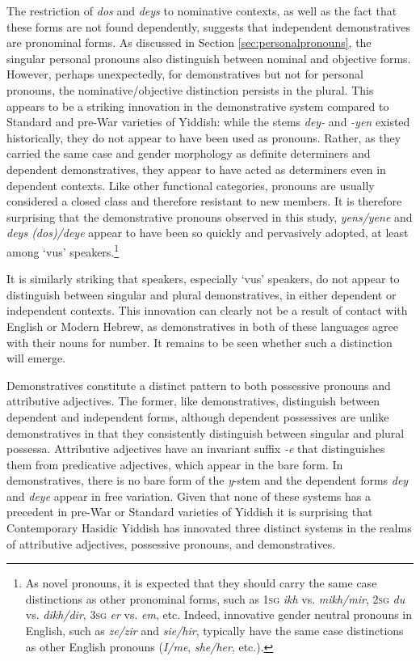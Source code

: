 \documentclass[output=paper, hidelinks]{langscibook}
\begin{document}
The restriction of \textit{dos} and \textit{deys} to nominative contexts, as well as the fact that these forms are not found dependently, suggests that independent demonstratives are pronominal forms. As discussed in Section \ref{sec:personalpronouns}, the singular personal pronouns also distinguish between nominal and objective forms. However, perhaps unexpectedly, for demonstratives but not for personal pronouns, the nominative/objective distinction persists in the plural. This appears to be a striking innovation in the demonstrative system compared to Standard and pre-War varieties of Yiddish: while the stems \textit{dey-} and \textit{-yen} existed historically, they do not appear to have been used as pronouns. Rather, as they carried the same case and gender morphology as definite determiners and dependent demonstratives, they appear to have acted as determiners even in dependent contexts. Like other functional categories, pronouns are usually considered a closed class and therefore resistant to new members. It is therefore surprising that the demonstrative pronouns observed in this study, \textit{yens/yene} and \textit{deys (dos)/deye} appear to have been so quickly and pervasively adopted, at least among `vus' speakers.\footnote{As novel pronouns, it is expected that they should carry the same case distinctions as other pronominal forms, such as 1\textsc{sg} \textit{ikh} vs. \textit{mikh/mir}, 2\textsc{sg} \textit{du} vs. \textit{dikh/dir}, 3\textsc{sg} \textit{er} vs. \textit{em}, etc. Indeed, innovative gender neutral pronouns in English, such as \textit{ze/zir} and \textit{sie/hir}, typically have the same case distinctions as other English pronouns (\textit{I/me}, \textit{she/her}, etc.).}

It is similarly striking that speakers, especially `vus' speakers, do not appear to distinguish between singular and plural demonstratives, in either dependent or independent contexts. This innovation can clearly not be a result of contact with English or Modern Hebrew, as demonstratives in both of these languages agree with their nouns for number. It remains to be seen whether such a distinction will emerge. 

\newpage
Demonstratives constitute a distinct pattern to both possessive pronouns and attributive adjectives. The former, like demonstratives, distinguish between dependent and independent forms, although dependent possessives are unlike de\-mon\-stra\-tives in that they consistently distinguish between singular and plural possessa. Attributive adjectives have an invariant suffix \textit{-e} that distinguishes them from predicative adjectives, which appear in the bare form. In demonstratives, there is no bare form of the \textit{y}-stem and the dependent forms \textit{dey} and \textit{deye} appear in free variation. Given that none of these systems has a precedent in pre-War or Standard varieties of Yiddish it is surprising that Contemporary Hasidic Yiddish has innovated three distinct systems in the realms of attributive adjectives, possessive pronouns, and demonstratives.
\end{document}
